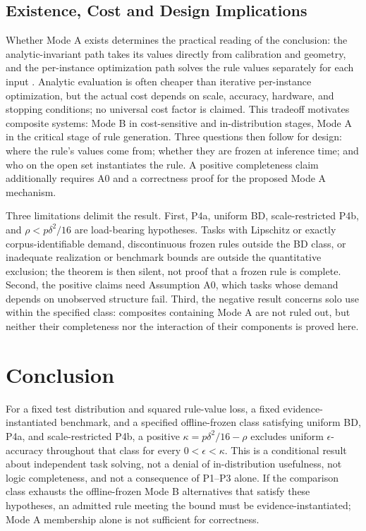 \documentclass[twoside,11pt]{article}
\begin{document}
\subsection{Existence, Cost and Design Implications}
\label{sec:cost}%

Whether Mode A exists determines the practical reading of the conclusion: the analytic-invariant path takes its values directly from calibration and geometry, and the per-instance optimization path solves the rule values separately for each input \citep{sun2020}. Analytic evaluation is often cheaper than iterative per-instance optimization, but the actual cost depends on scale, accuracy, hardware, and stopping conditions; no universal cost factor is claimed. This tradeoff motivates composite systems: Mode B in cost-sensitive and in-distribution stages, Mode A in the critical stage of rule generation. Three questions then follow for design: where the rule's values come from; whether they are frozen at inference time; and who on the open set instantiates the rule. A positive completeness claim additionally requires A0 and a correctness proof for the proposed Mode A mechanism.

Three limitations delimit the result. First, P4a, uniform BD, scale-restricted P4b, and $\rho<p\delta^2/16$ are load-bearing hypotheses. Tasks with Lipschitz or exactly corpus-identifiable demand, discontinuous frozen rules outside the BD class, or inadequate realization or benchmark bounds are outside the quantitative exclusion; the theorem is then silent, not proof that a frozen rule is complete. Second, the positive claims need Assumption A0, which tasks whose demand depends on unobserved structure fail. Third, the negative result concerns solo use within the specified class: composites containing Mode A are not ruled out, but neither their completeness nor the interaction of their components is proved here.

\section{Conclusion}
\label{ch:conclusion}%

For a fixed test distribution and squared rule-value loss, a fixed evidence-instantiated benchmark, and a specified offline-frozen class satisfying uniform BD, P4a, and scale-restricted P4b, a positive $\kappa=p\delta^2/16-\rho$ excludes uniform $\epsilon$-accuracy throughout that class for every $0<\epsilon<\kappa$. This is a conditional result about independent task solving, not a denial of in-distribution usefulness, not logic completeness, and not a consequence of P1--P3 alone. If the comparison class exhausts the offline-frozen Mode B alternatives that satisfy these hypotheses, an admitted rule meeting the bound must be evidence-instantiated; Mode A membership alone is not sufficient for correctness.
\end{document}
